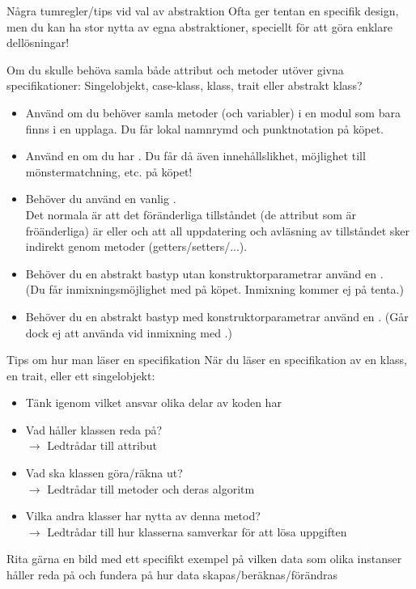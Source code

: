 \begin{Slide}{Några tumregler/tips vid val av abstraktion}\SlideFontSmall
Ofta ger tentan en specifik design, men du kan ha stor nytta av egna abstraktioner, speciellt  för att göra enklare dellösningar!

\pause\vspace{1em}Om du skulle behöva samla både attribut och metoder utöver givna specifikationer:
Singelobjekt, case-klass, klass, trait eller abstrakt klass?
\begin{itemize}\SlideFontTiny
\item Använd  om du behöver samla metoder (och variabler) i en modul som bara finns i en upplaga. Du får lokal namnrymd och punktnotation på köpet.
\item Använd en  om du har . Du får då även innehållslikhet, möjlighet till mönstermatchning, etc. på köpet!
\item Behöver du   använd en vanlig .\\ Det normala är att det föränderliga tillståndet (de attribut som är fröänderliga) är  eller  och att all uppdatering och avläsning av tillståndet sker indirekt genom metoder (getters/setters/...).
\item Behöver du en abstrakt bastyp utan konstruktorparametrar använd en . \\(Du får inmixningsmöjlighet med  på köpet. Inmixning kommer ej på tenta.)
\item Behöver du en abstrakt bastyp med konstruktorparametrar använd en . (Går dock ej att använda vid inmixning med .)
\end{itemize}
\end{Slide}


\begin{Slide}{Tips om hur man läser en specifikation}\SlideFontSmall
När du läser en specifikation av en klass, en trait, eller ett singelobjekt:
\begin{itemize}
\item Tänk igenom vilket ansvar olika delar av koden har
\item Vad håller klassen reda på? \\$\rightarrow$ Ledtrådar till attribut
\item Vad ska klassen göra/räkna ut? \\$\rightarrow$ Ledtrådar till metoder och deras algoritm
\item Vilka andra klasser har nytta av denna metod? \\$\rightarrow$ Ledtrådar till hur klasserna samverkar för att lösa uppgiften
\end{itemize}
Rita gärna en bild med ett specifikt exempel på vilken data som olika instanser håller reda på och fundera på hur data skapas/beräknas/förändras
\end{Slide}


